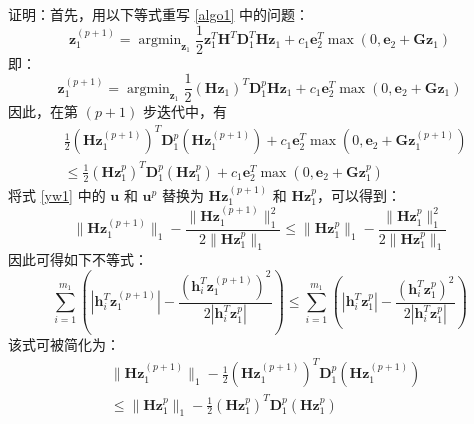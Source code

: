 证明：首先，用以下等式重写 \eqref{algo1} 中的问题：
\begin{equation}
\mathbf{z}^{(p+1)}_{1}=\mathop{\arg\min}_{\mathbf{z}_{1}}
\frac{1}{2}\mathbf{z}^{T}_{1}\mathbf{H}^{T}\mathbf{D}^{T}_{1}\mathbf{H}\mathbf{z}_{1}+
c_{1}\mathbf{e}^{T}_{2}\mathop{\max}(0,\mathbf{e}_{2}+\mathbf{Gz}_{1})
\label{yw3}
\end{equation}
即：
\begin{equation}
\mathbf{z}^{(p+1)}_{1}=\mathop{\arg\min}_{\mathbf{z}_{1}}
\frac{1}{2}(\mathbf{Hz}_{1})^{T}\mathbf{D}^{p}_{1}\mathbf{Hz}_{1}+
c_{1}\mathbf{e}^{T}_{2}\mathop{\max}(0,\mathbf{e}_{2}+\mathbf{Gz}_{1})
\label{yw4}
\end{equation}
因此，在第 $(p+1)$ 步迭代中，有
\begin{equation}
\begin{aligned}
&\frac{1}{2}(\mathbf{Hz}^{(p+1)}_{1})^{T}\mathbf{D}^{p}_{1}(\mathbf{Hz}^{(p+1)}_{1})+
c_{1}\mathbf{e}^{T}_{2}\mathop{\max}(0,\mathbf{e}_{2}+\mathbf{Gz}^{(p+1)}_{1})\\
&\le\frac{1}{2}(\mathbf{Hz}^{p}_{1})^{T}\mathbf{D}^{p}_{1}(\mathbf{Hz}^{p}_{1})+
c_{1}\mathbf{e}^{T}_{2}\mathop{\max}(0,\mathbf{e}_{2}+\mathbf{Gz}^{p}_{1})
\end{aligned}
\label{yw5}
\end{equation}
将式 \eqref{yw1} 中的 $\mathbf{u}$ 和 $\mathbf{u}^p$ 替换为 $\mathbf{Hz}^{(p+1)}_{1}$ 和 $\mathbf{Hz}^{p}_{1}$，可以得到：
\begin{equation}
\|\mathbf{Hz}^{(p+1)}_{1}\|_{1}-\frac{\|\mathbf{Hz}^{(p+1)}_{1}\|^{2}_{1}}{2\|\mathbf{Hz}^{p}_{1}\|_{1}}\le
\|\mathbf{Hz}^{p}_{1}\|_{1}-\frac{\|\mathbf{Hz}^{p}_{1}\|^{2}_{1}}{2\|\mathbf{Hz}^{p}_{1}\|_{1}}
\label{yw6}
\end{equation}
因此可得如下不等式：
\begin{equation}
\sum^{m_1}_{i=1}(\left|\mathbf{h}^{T}_{i}\mathbf{z}^{(p+1)}_1\right|-
\frac{(\mathbf{h}^{T}_{i}\mathbf{z}^{(p+1)}_1)^2}
{2\left|\mathbf{h}^{T}_{i}\mathbf{z}^{p}_{1}\right|})\le
\sum^{m_1}_{i=1}(\left|\mathbf{h}^{T}_{i}\mathbf{z}^{p}_1\right|-
\frac{(\mathbf{h}^{T}_{i}\mathbf{z}^{p}_1)^2}
{2\left|\mathbf{h}^{T}_{i}\mathbf{z}^{p}_{1}\right|})
\label{yw7}
\end{equation}
该式可被简化为：
\begin{equation}
\begin{aligned}
&\|\mathbf{Hz}^{(p+1)}_{1}\|_{1}-\frac{1}{2}(\mathbf{Hz}^{(p+1)}_{1})^{T}\mathbf{D}^{p}_{1}(\mathbf{Hz}^{(p+1)}_{1})\\
&\le\|\mathbf{Hz}^{p}_{1}\|_{1}-\frac{1}{2}(\mathbf{Hz}^{p}_{1})^{T}\mathbf{D}^{p}_{1}(\mathbf{Hz}^{p}_{1})     \end{aligned}
\label{yw8}
\end{equation}
